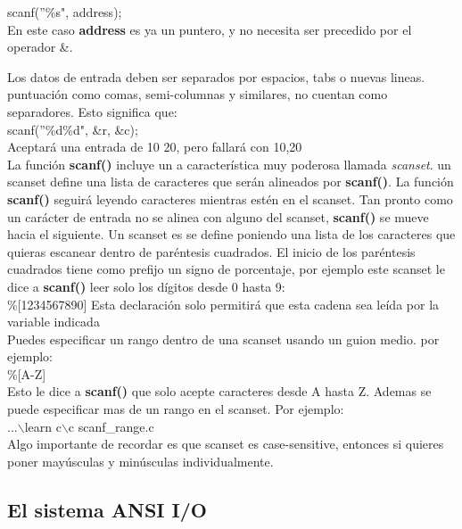 \documentclass[]{article}
\begin{document}
	scanf(''\%s", address);\\
	
	En este caso \textbf{address} es ya un puntero, y no necesita ser precedido por el operador \&.
	
	Los datos de entrada deben ser separados por espacios, tabs o nuevas lineas. puntuación como comas, semi-columnas y similares, no cuentan como separadores. Esto significa que:\\
	
	scanf(''\%d\%d", \&r, \&c);\\
	
	Aceptará una entrada de 10 20, pero fallará con 10,20\\
	
	La función \textbf{scanf()} incluye un a característica muy poderosa llamada \textit{scanset}. un scanset define una lista de caracteres que serán alineados por \textbf{scanf()}. La función \textbf{scanf()} seguirá leyendo caracteres mientras estén en el scanset. Tan pronto como un carácter de entrada no se alinea con alguno del scanset, \textbf{scanf()} se mueve hacia el siguiente. Un scanset es se define poniendo una lista de los caracteres que quieras escanear dentro de paréntesis cuadrados. El inicio de los paréntesis cuadrados tiene como prefijo un signo de porcentaje, por ejemplo este scanset le dice a \textbf{scanf()} leer solo los dígitos desde 0 hasta 9:\\
	
	\%[1234567890] Esta declaración solo permitirá que esta cadena sea leída por la variable indicada\\
	
	Puedes especificar un rango dentro de una scanset usando un guion medio. por ejemplo:\\
	
	\%[A-Z]\\
	
	Esto le dice a \textbf{scanf()} que solo acepte caracteres desde A hasta Z. Ademas se puede especificar mas de un rango en el scanset. Por ejemplo:\\
	
	...$\backslash$learn c$\backslash$c scanf\_range.c\\
	
	Algo importante de recordar es que scanset es case-sensitive, entonces si quieres poner mayúsculas y minúsculas individualmente.
	
	\subsection{El sistema ANSI I/O}
	
\end{document}
